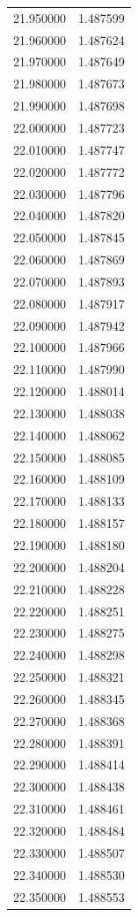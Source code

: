 \begin{tabular}{rr}
21.950000 & 1.487599 \\
21.960000 & 1.487624 \\
21.970000 & 1.487649 \\
21.980000 & 1.487673 \\
21.990000 & 1.487698 \\
22.000000 & 1.487723 \\
22.010000 & 1.487747 \\
22.020000 & 1.487772 \\
22.030000 & 1.487796 \\
22.040000 & 1.487820 \\
22.050000 & 1.487845 \\
22.060000 & 1.487869 \\
22.070000 & 1.487893 \\
22.080000 & 1.487917 \\
22.090000 & 1.487942 \\
22.100000 & 1.487966 \\
22.110000 & 1.487990 \\
22.120000 & 1.488014 \\
22.130000 & 1.488038 \\
22.140000 & 1.488062 \\
22.150000 & 1.488085 \\
22.160000 & 1.488109 \\
22.170000 & 1.488133 \\
22.180000 & 1.488157 \\
22.190000 & 1.488180 \\
22.200000 & 1.488204 \\
22.210000 & 1.488228 \\
22.220000 & 1.488251 \\
22.230000 & 1.488275 \\
22.240000 & 1.488298 \\
22.250000 & 1.488321 \\
22.260000 & 1.488345 \\
22.270000 & 1.488368 \\
22.280000 & 1.488391 \\
22.290000 & 1.488414 \\
22.300000 & 1.488438 \\
22.310000 & 1.488461 \\
22.320000 & 1.488484 \\
22.330000 & 1.488507 \\
22.340000 & 1.488530 \\
22.350000 & 1.488553 \\

\end{tabular}
